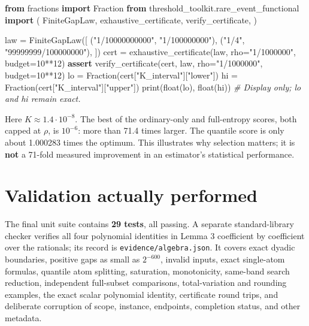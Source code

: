 \documentclass[
  11pt,
  a4paper,
]{article}
\newenvironment{Shaded}{}{}
\newcommand{\BuiltInTok}[1]{\textcolor[rgb]{0.00,0.50,0.00}{#1}}
\newcommand{\CommentTok}[1]{\textcolor[rgb]{0.38,0.63,0.69}{\textit{#1}}}
\newcommand{\ControlFlowTok}[1]{\textcolor[rgb]{0.00,0.44,0.13}{\textbf{#1}}}
\newcommand{\DecValTok}[1]{\textcolor[rgb]{0.25,0.63,0.44}{#1}}
\newcommand{\ImportTok}[1]{\textcolor[rgb]{0.00,0.50,0.00}{\textbf{#1}}}
\newcommand{\NormalTok}[1]{#1}
\newcommand{\OperatorTok}[1]{\textcolor[rgb]{0.40,0.40,0.40}{#1}}
\newcommand{\StringTok}[1]{\textcolor[rgb]{0.25,0.44,0.63}{#1}}
\begin{document}
\begin{Shaded}
\begin{Highlighting}[]
\ImportTok{from}\NormalTok{ fractions }\ImportTok{import}\NormalTok{ Fraction}
\ImportTok{from}\NormalTok{ threshold\_toolkit.rare\_event\_functional }\ImportTok{import}\NormalTok{ (}
\NormalTok{    FiniteGapLaw, exhaustive\_certificate, verify\_certificate,}
\NormalTok{)}

\NormalTok{law }\OperatorTok{=}\NormalTok{ FiniteGapLaw([}
\NormalTok{    (}\StringTok{"1/10000000000"}\NormalTok{, }\StringTok{"1/100000000"}\NormalTok{),}
\NormalTok{    (}\StringTok{"1/4"}\NormalTok{, }\StringTok{"99999999/100000000"}\NormalTok{),}
\NormalTok{])}
\NormalTok{cert }\OperatorTok{=}\NormalTok{ exhaustive\_certificate(law, rho}\OperatorTok{=}\StringTok{"1/1000000"}\NormalTok{, budget}\OperatorTok{=}\DecValTok{10}\OperatorTok{**}\DecValTok{12}\NormalTok{)}
\ControlFlowTok{assert}\NormalTok{ verify\_certificate(cert, law, rho}\OperatorTok{=}\StringTok{"1/1000000"}\NormalTok{, budget}\OperatorTok{=}\DecValTok{10}\OperatorTok{**}\DecValTok{12}\NormalTok{)}
\NormalTok{lo }\OperatorTok{=}\NormalTok{ Fraction(cert[}\StringTok{"K\_interval"}\NormalTok{][}\StringTok{"lower"}\NormalTok{])}
\NormalTok{hi }\OperatorTok{=}\NormalTok{ Fraction(cert[}\StringTok{"K\_interval"}\NormalTok{][}\StringTok{"upper"}\NormalTok{])}
\BuiltInTok{print}\NormalTok{(}\BuiltInTok{float}\NormalTok{(lo), }\BuiltInTok{float}\NormalTok{(hi))  }\CommentTok{\# Display only; lo and hi remain exact.}
\end{Highlighting}
\end{Shaded}

Here \(K\approx1.4\cdot10^{-8}\). The best of the ordinary-only and
full-entropy scores, both capped at \(\rho\), is \(10^{-6}\): more than
71.4 times larger. The quantile score is only about 1.000283 times the
optimum. This illustrates why selection matters; it is \textbf{not} a
71-fold measured improvement in an estimator's statistical performance.

\section{Validation actually
performed}\label{validation-actually-performed}

The final unit suite contains \textbf{29 tests}, all passing. A separate
standard-library checker verifies all four polynomial identities in
Lemma 3 coefficient by coefficient over the rationals; its record is
\texttt{evidence/algebra.json}. It covers exact dyadic boundaries,
positive gaps as small as \(2^{-600}\), invalid inputs, exact
single-atom formulas, quantile atom splitting, saturation, monotonicity,
same-band search reduction, independent full-subset comparisons,
total-variation and rounding examples, the exact scalar polynomial
identity, certificate round trips, and deliberate corruption of scope,
instance, endpoints, completion status, and other metadata.
\end{document}
